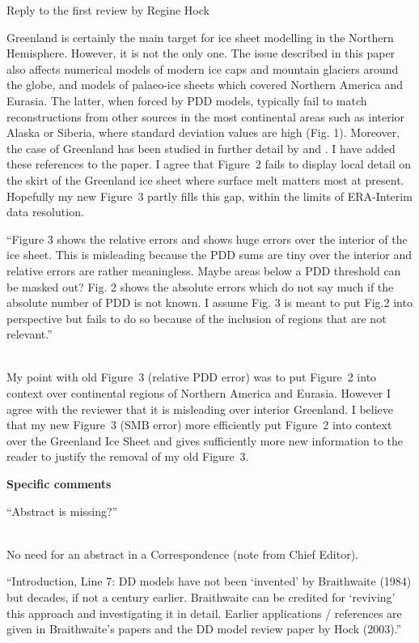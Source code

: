 \documentclass{letter}
\newcommand{\rev}[0]{\color{blue!50!black}\it}
\newcommand{\revpoint}[1]{{\rev\item``#1''}\\}
\begin{document}
\begin{letter}{Reply to the first review by Regine Hock}
\begin{enumerate}[resume]
    Greenland is certainly the main target for ice sheet modelling in the Northern Hemisphere. However, it is not the only one. The issue described in this paper also affects numerical models of modern ice caps and mountain glaciers around the globe, and models of palaeo-ice sheets which covered Northern America and Eurasia. The latter, when forced by PDD models, typically fail to match reconstructions from other sources in the most continental areas such as interior Alaska or Siberia, where standard deviation values are high (Fig. 1). Moreover, the case of Greenland has been studied in further detail by \citet{fausto-etal-2011} and \citet{rau-rogozhina-2013}. I have added these references to the paper. I agree that Figure~2 fails to display local detail on the skirt of the Greenland ice sheet where surface melt matters most at present. Hopefully my new Figure~3 partly fills this gap, within the limits of ERA-Interim data resolution.

    \revpoint{Figure 3 shows the relative errors and shows huge errors over the interior of the ice sheet. This is misleading because the PDD sums are tiny over the interior and relative errors are rather meaningless. Maybe areas below a PDD threshold can be masked out? Fig. 2 shows the absolute errors which do not say much if the absolute number of PDD is not known. I assume Fig. 3 is meant to put Fig.2 into perspective but fails to do so because of the inclusion of regions that are not relevant.}

    My point with old Figure~3 (relative PDD error) was to put Figure~2 into context over continental regions of Northern America and Eurasia. However I agree with the reviewer that it is misleading over interior Greenland. I believe that my new Figure~3 (SMB error) more efficiently put Figure~2 into context over the Greenland Ice Sheet and gives sufficiently more new information to the reader to justify the removal of my old Figure~3.

\end{enumerate}


\textbf{Specific comments}

\begin{enumerate}[resume]

    \revpoint{Abstract is missing?}

    No need for an abstract in a Correspondence (note from Chief Editor).

    \revpoint{Introduction, Line 7: DD models have not been ‘invented’ by Braithwaite (1984) but decades, if not a century earlier. Braithwaite can be credited for ‘reviving’ this approach and investigating it in detail. Earlier applications / references are given in Braithwaite’s papers and the DD model review paper by Hock (2003).}


\end{enumerate}
\end{letter}
\end{document}
